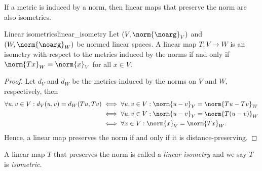 If a metric is induced by a norm, then linear maps that preserve the norm are also isometries.
\begin{proposition}{Linear isometries}{linear_isometry}
    Let \((V, \norm{\noarg}_V)\) and \((W, \norm{\noarg}_W)\) be normed linear spaces. A linear map \(T : V \to W\) is an isometry with respect to the metrics induced by the norms if and only if \(\norm{Tx}_W = \norm{x}_V\) for all \(x \in V\).
\end{proposition}
\begin{proof}
    Let \(d_V\) and \(d_W\) be the metrics induced by the norms on \(V\) and \(W\), respectively, then
    \begin{align*}
        \forall u, v \in V: d_V(u,v) = d_W(Tu, Tv) &\iff \forall u,v \in V: \norm{u-v}_V = \norm{Tu - Tv}_W\\
                                                   &\iff \forall u,v \in V: \norm{u-v}_V = \norm{T(u-v)}_W\\
                                                   &\iff \forall x \in V: \norm{x}_V = \norm{Tx}_W.
    \end{align*}
    Hence, a linear map preserves the norm if and only if it is distance-preserving.
\end{proof}
\begin{remark}
    A linear map \(T\) that preserves the norm is called a \emph{linear isometry} and we say \(T\) is \emph{isometric}.
\end{remark}

